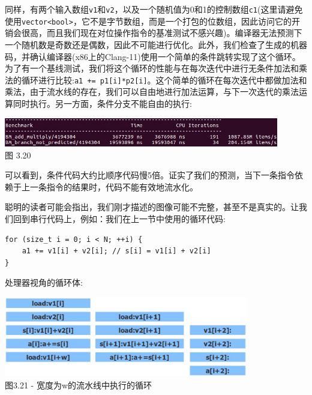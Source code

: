 同样，有两个输入数组\texttt{v1}和\texttt{v2}，以及一个随机值为0和1的控制数组\texttt{c1}(这里请避免使用\texttt{vector<bool>}，它不是字节数组，而是一个打包的位数组，因此访问它的开销会很高，而且我们现在对位操作指令的基准测试不感兴趣)。编译器无法预测下一个随机数是奇数还是偶数，因此不可能进行优化。此外，我们检查了生成的机器码，并确认编译器(x86上的Clang-11)使用一个简单的条件跳转实现了这个循环。为了有一个基线测试，我们将这个循环的性能与在每次迭代中进行无条件加法和乘法的循环进行比较:\texttt{a1 += p1[i]*p2[i]}。这个简单的循环在每次迭代中都做加法和乘法，由于流水线的存在，我们可以自由地进行加法运算，与下一次迭代的乘法运算同时执行。另一方面，条件分支不能自由的执行:

\begin{center}
\includegraphics[width=0.9\textwidth]{content/1/chapter3/images/20.jpg}\\
图 3.20
\end{center}

可以看到，条件代码大约比顺序代码慢5倍。证实了我们的预测，当下一条指令依赖于上一条指令的结果时，代码不能有效地流水化。


聪明的读者可能会指出，我们刚才描述的图像可能不完整，甚至不是真实的。让我们回到串行代码上，例如：我们在上一节中使用的循环代码:

\begin{lstlisting}[style=styleCXX]
for (size_t i = 0; i < N; ++i) {
	a1 += v1[i] + v2[i]; // s[i] = v1[i] + v2[i]
}
\end{lstlisting}

处理器视角的循环体:

\begin{center}
\includegraphics[width=0.8\textwidth]{content/1/chapter3/images/21.jpg}\\
图3.21 - 宽度为w的流水线中执行的循环
\end{center}

